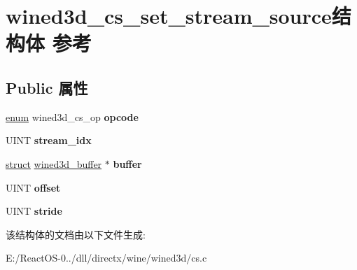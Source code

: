 \hypertarget{structwined3d__cs__set__stream__source}{}\section{wined3d\+\_\+cs\+\_\+set\+\_\+stream\+\_\+source结构体 参考}
\label{structwined3d__cs__set__stream__source}
\subsection*{Public 属性}
\begin{DoxyCompactItemize}
\item 
\mbox{\label{structwined3d__cs__set__stream__source_a42718a0a018920da828377476a5c3178}} 
\hyperlink{interfaceenum}{enum} wined3d\+\_\+cs\+\_\+op {\bfseries opcode}
\item 
\mbox{\label{structwined3d__cs__set__stream__source_ad45fbdb984c7ecc60a647328ae3046c6}} 
U\+I\+NT {\bfseries stream\+\_\+idx}
\item 
\mbox{\label{structwined3d__cs__set__stream__source_aaa77a58dc624c2882cba965f16fd93b5}} 
\hyperlink{interfacestruct}{struct} \hyperlink{structwined3d__buffer}{wined3d\+\_\+buffer} $\ast$ {\bfseries buffer}
\item 
\mbox{\label{structwined3d__cs__set__stream__source_a293df9dab2454df7cad38ad1f1bc89a3}} 
U\+I\+NT {\bfseries offset}
\item 
\mbox{\label{structwined3d__cs__set__stream__source_a98cb4ee2d46bc926e3ee5963099657a4}} 
U\+I\+NT {\bfseries stride}
\end{DoxyCompactItemize}


该结构体的文档由以下文件生成\+:\begin{DoxyCompactItemize}
\item 
E\+:/\+React\+O\+S-\/0../dll/directx/wine/wined3d/cs.\+c\end{DoxyCompactItemize}
